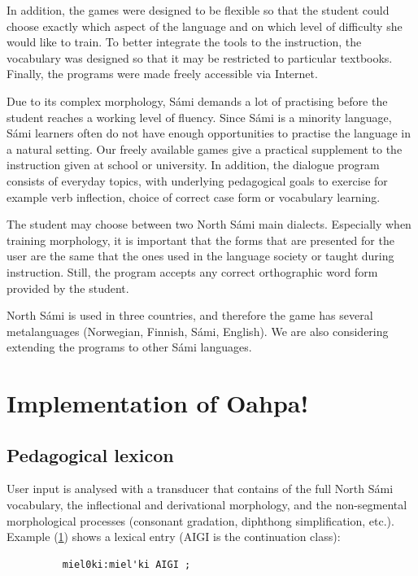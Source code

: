 \documentclass[11pt]{article}
\begin{document}
In addition, the games were designed to be flexible so that the student could choose exactly which aspect of the language and on which level of difficulty she would like to train. To better integrate the tools to the instruction, the vocabulary was designed so that it may be restricted to particular textbooks. Finally, the programs were made freely accessible via Internet.

Due to its complex morphology, Sámi demands a lot of practising before the student reaches 
a working level of fluency. %
Since Sámi is a minority language, Sámi learners often do not have enough opportunities to practise the language in a natural setting. Our freely available games give a practical supplement to the instruction given at school or university. In addition, the dialogue program consists of everyday topics, with underlying pedagogical goals to exercise for example verb inflection, choice of correct case form or vocabulary learning. 

The student may choose between two North Sámi main dialects. Especially when training morphology, it is important that the forms that are presented for the user are the same that the ones used in the language society or taught during instruction. Still, the program accepts any correct orthographic word form provided by the student.

North Sámi is used in three countries, and therefore the game has several metalanguages (Norwegian, Finnish, Sámi, English). We are also considering extending the programs to other Sámi languages.

\section{Implementation of Oahpa!}

\subsection{Pedagogical lexicon}

User input is analysed with a transducer that contains of the full North Sámi vocabulary, the inflectional and derivational morphology, and the non-segmental morphological processes (consonant gradation, diphthong simplification, etc.). Example (\ref{nounsmelex}) shows a lexical entry (AIGI is the continuation class):

\begin{figure}[htbp]
\begin{center}
\begin{verbatim}
    miel0ki:miel'ki AIGI ;
\end{verbatim}
\label{nounsmelex}
\end{center}
\end{figure}
\end{document}
